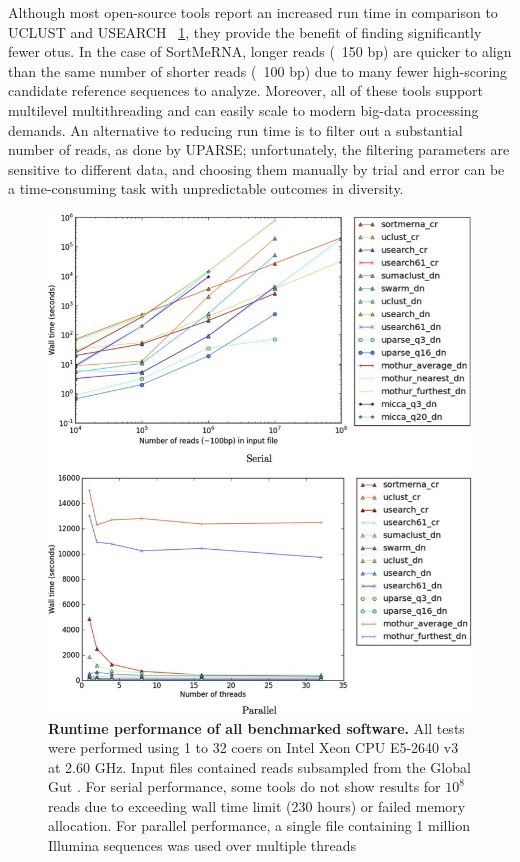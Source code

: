 Although most open-source tools report an increased run time in comparison to UCLUST
and USEARCH ~\ref{stateArtF5}, they provide the benefit of finding significantly
fewer \gls{otu}s. In the case of SortMeRNA, longer reads (~150 \gls{bp}) are quicker
to align than the same number of shorter reads (~100 \gls{bp}) due to many fewer
high-scoring candidate reference sequences to analyze. Moreover, all of these tools
support multilevel multithreading and can easily scale to modern big-data processing
demands. An alternative to reducing run time is to filter out a substantial
number of reads, as done by UPARSE; unfortunately, the filtering parameters are
sensitive to different data, and choosing them manually by trial and error can be
a time-consuming task with unpredictable outcomes in diversity.

\begin{figure}[htbp]
\begin{center}
\includegraphics[height=0.55\textheight]{chapter_otupicking_figures/stateArtF5.png}
\end{center}
\caption[Runtime performance of all benchmarked software]{\textbf{Runtime performance of all benchmarked software.}
All tests were performed using 1 to 32 coers on Intel Xeon CPU E5-2640 v3 at 2.60 GHz.
Input files contained reads subsampled from the Global Gut \cite{Yatsunenko2012}.
For serial performance, some tools do not show results for $10^8$ reads due to
exceeding wall time limit (230 hours) or failed memory allocation. For parallel performance,
a single file containing 1 million Illumina sequences was used over multiple threads}
\label{stateArtF5}
\end{figure}

